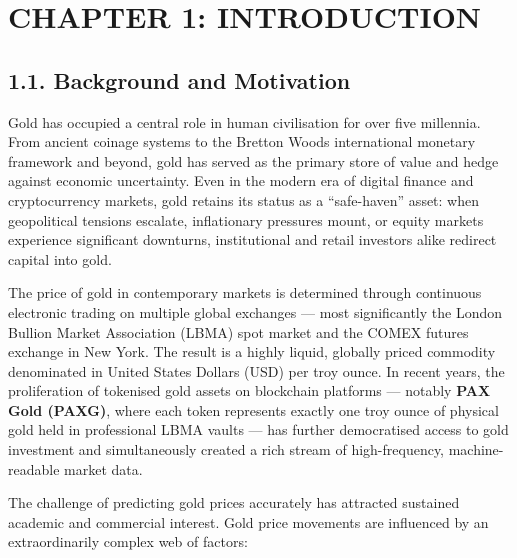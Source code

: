 \section{CHAPTER 1: INTRODUCTION}

\subsection{1.1. Background and Motivation}

Gold has occupied a central role in human civilisation for over five millennia. From ancient coinage systems to the Bretton Woods international monetary framework and beyond, gold has served as the primary store of value and hedge against economic uncertainty. Even in the modern era of digital finance and cryptocurrency markets, gold retains its status as a ``safe-haven'' asset: when geopolitical tensions escalate, inflationary pressures mount, or equity markets experience significant downturns, institutional and retail investors alike redirect capital into gold.

The price of gold in contemporary markets is determined through continuous electronic trading on multiple global exchanges --- most significantly the London Bullion Market Association (LBMA) spot market and the COMEX futures exchange in New York. The result is a highly liquid, globally priced commodity denominated in United States Dollars (USD) per troy ounce. In recent years, the proliferation of tokenised gold assets on blockchain platforms --- notably \textbf{PAX Gold (PAXG)}, where each token represents exactly one troy ounce of physical gold held in professional LBMA vaults --- has further democratised access to gold investment and simultaneously created a rich stream of high-frequency, machine-readable market data.

The challenge of predicting gold prices accurately has attracted sustained academic and commercial interest. Gold price movements are influenced by an extraordinarily complex web of factors:

